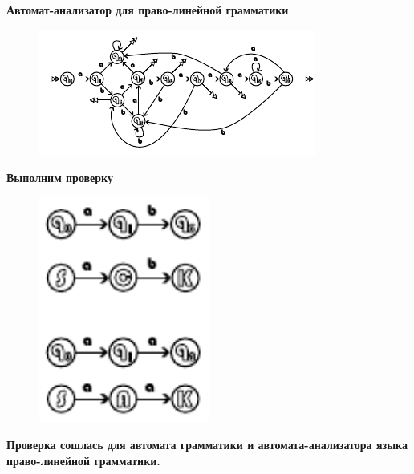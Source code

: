 \documentclass[a4paper, 14pt]{extarticle}
\begin{document}
\newpage

\begin{center}
  \normalsize
  \bfseries
  Автомат-анализатор для право-линейной грамматики
\end{center}

\begin{figure}[h]
  \centering
  \includegraphics[width=\textwidth,height=\textheight,keepaspectratio]{graphics/diagramm3}
\end{figure}

\vfill

\begin{center}
  \normalsize
  \bfseries
  Выполним проверку
\end{center}

\begin{figure}[h]
  \centering
  \includegraphics[width=0.5\textwidth,height=0.5\textheight,keepaspectratio]{graphics/diagramm4}
\end{figure}

\begin{center}
  \normalsize
  \bfseries
  Проверка сошлась для автомата грамматики и автомата-анализатора языка право-линейной грамматики.
\end{center}
\end{document}

